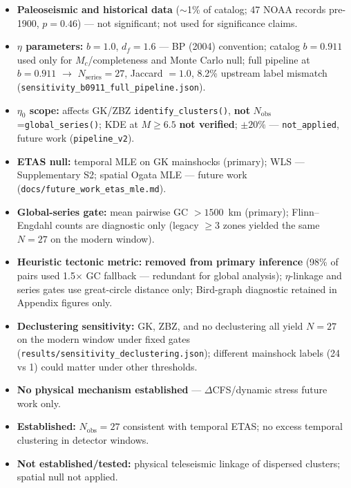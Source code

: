 \documentclass[draft]{agujournal2019}
\begin{document}
\begin{itemize}
\item \textbf{Paleoseismic and historical data} ($\sim$1\% of catalog; 47 NOAA records
      pre-1900, $p = 0.46$) --- not significant; not used for significance claims.
\item \textbf{$\eta$ parameters:} $b=1.0$, $d_f=1.6$ --- BP (2004) convention;
      catalog $b=0.911$ used only for $M_c$/completeness and Monte Carlo null;
      full pipeline at $b=0.911$ $\to$ $N_\mathrm{series}=27$, Jaccard $=1.0$,
      8.2\% upstream label mismatch
      (\texttt{sensitivity\_b0911\_full\_pipeline.json}).
\item \textbf{$\eta_0$ scope:} affects GK/ZBZ \texttt{identify\_clusters()},
      \textbf{not} $N_\mathrm{obs}$=\texttt{global\_series()}; KDE at $M\ge 6.5$
      \textbf{not verified}; $\pm 20\%$ --- \texttt{not\_applied}, future work
      (\texttt{pipeline\_v2}).
\item \textbf{ETAS null:} temporal MLE on GK mainshocks (primary);
      WLS --- Supplementary S2;
      spatial Ogata MLE --- future work (\texttt{docs/future\_work\_etas\_mle.md}).
\item \textbf{Global-series gate:} mean pairwise GC $> 1500$~km (primary);
      Flinn--Engdahl counts are diagnostic only (legacy $\ge 3$ zones
      yielded the same $N=27$ on the modern window).
\item \textbf{Heuristic tectonic metric:} \textbf{removed from primary inference}
      (98\% of pairs used 1.5$\times$ GC fallback --- redundant for global
      analysis); $\eta$-linkage and series gates use great-circle distance only;
      Bird-graph diagnostic retained in Appendix figures only.
\item \textbf{Declustering sensitivity:} GK, ZBZ, and no declustering all yield
      $N=27$ on the modern window under fixed gates
      (\texttt{results/sensitivity\_declustering.json}); different mainshock
      labels (24 vs 1) could matter under other thresholds.
\item \textbf{No physical mechanism established} --- $\Delta$CFS/dynamic stress future work only.
\item \textbf{Established:} $N_\mathrm{obs}=27$ consistent with temporal ETAS;
      no excess temporal clustering in detector windows.
\item \textbf{Not established/tested:} physical teleseismic linkage of dispersed
      clusters; spatial null not applied.
\end{itemize}
\end{document}
